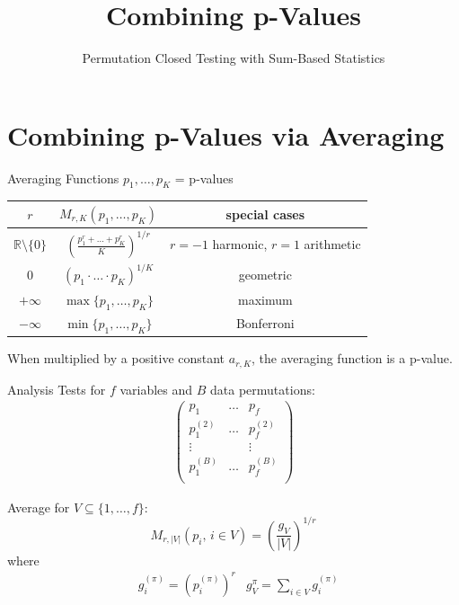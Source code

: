 \documentclass[aspectratio=169]{beamer}
\title{Combining p-Values}
\subtitle{Permutation Closed Testing with Sum-Based Statistics}
\date{}
\author{}
\institute{}
\begin{document}
\maketitle







\section{Combining p-Values via Averaging}
\begin{frame}{Averaging Functions}
$p_1,\ldots,p_K$ = p-values

\vspace{3mm}
\begin{table}[h!]
\centering
\begin{tabular}{ccc}
\toprule
$r$ & $M_{r,K}(p_1,\ldots,p_K)$ & special cases\\
\midrule
$\mathbb{R}\setminus\{0\}$ & $\left(\frac{p_1^r + \ldots + p_K^r}{K}\right)^{1/r}$ & $r=-1$ harmonic, $r=1$ arithmetic\\
0 & $\left(p_1 \cdot \ldots \cdot p_K\right)^{1/K}$ & geometric\\
$+\infty$ & $\max\{p_1,\ldots,p_K\}$ & maximum\\
$-\infty$ & $\min\{p_1,\ldots,p_K\}$ & Bonferroni\\
\bottomrule
\end{tabular}
\end{table}

\vspace{3mm}
When multiplied by a positive constant $a_{r,K}$, the averaging function is a p-value.
\end{frame}






\begin{frame}{Analysis}
Tests for $f$ variables and $B$ data permutations:
\begin{align*}
\begin{pmatrix}
p_1 & \ldots & p_f\\
p_1^{(2)} & \ldots & p_f^{(2)}\\
\vdots &  & \vdots\\
p_1^{(B)} & \ldots & p_f^{(B)}\\
\end{pmatrix}
\end{align*}


Average for $V\subseteq\{1,\ldots,f\}$:
\[M_{r,|V|}(p_i,\,i\in V)=\left(\frac{g_V}{|V|}\right)^{1/r}\]
where
\begin{align*}
& g_i^{(\pi)} = (p_i^{(\pi)})^r & g_V^{\pi} = \sum_{i\in V} g_i^{(\pi)}
\end{align*}
\end{frame}
\end{document}
